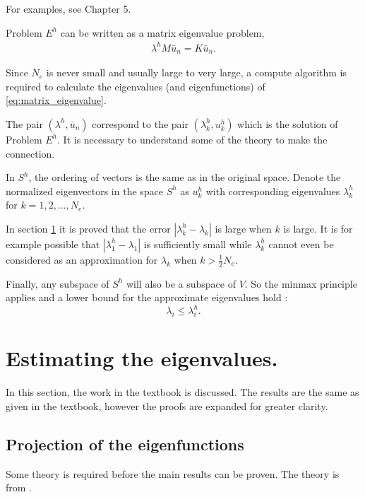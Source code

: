 \documentclass[../../main.tex]{subfiles}
\begin{document}
For examples, see Chapter 5.

Problem $E^h$ can be written as a matrix eigenvalue problem,
\begin{eqnarray}
	\lambda^hM\bar{u}_n = K\bar{u}_n. \label{eq:matrix_eigenvalue}
\end{eqnarray} 

Since $N_e$ is never small and usually large to very large, a compute algorithm is required to calculate the eigenvalues (and eigenfunctions) of \eqref{eq:matrix_eigenvalue}.

The pair $(\lambda^h, \bar{u}_n)$ correspond to the pair $(\lambda^h_k, u^h_k)$ which is the solution of Problem $E^h$. It is necessary to understand some of the theory to make the connection.

In $S^h$, the ordering of vectors is the same as in the original space. Denote the normalized eigenvectors in the space $S^h$ as $u^h_k$ with corresponding eigenvalues $\lambda^h_k$ for $k = 1,2,...,N_e$.

In section \ref{sec:estimating_the_eigenvalues} it is proved that the error $| \lambda_k^h - \lambda_k|$ is large when $k$ is large. It is for example possible that $|\lambda^h_1 - \lambda_1|$ is sufficiently small while $\lambda^h_k$ cannot even be considered as an approximation for $\lambda_k$ when $\displaystyle k > \frac{1}{2}N_e$.

Finally, any subspace of $S^h$ will also be a subspace of $V$. So the minmax principle applies and a lower bound for the approximate eigenvalues hold \cite{SF73}:
\begin{equation}
	\lambda_i \leq \lambda_i^h.
\end{equation}

\section{Estimating the eigenvalues.} \label{sec:estimating_the_eigenvalues}
In this section, the work in the textbook \cite{SF73} is discussed. The results are the same as given in the textbook, however the proofs are expanded for greater clarity.

\subsection{Projection of the eigenfunctions}

Some theory is required before the main results can be proven. The theory is from \cite{SF73}.
\end{document}
